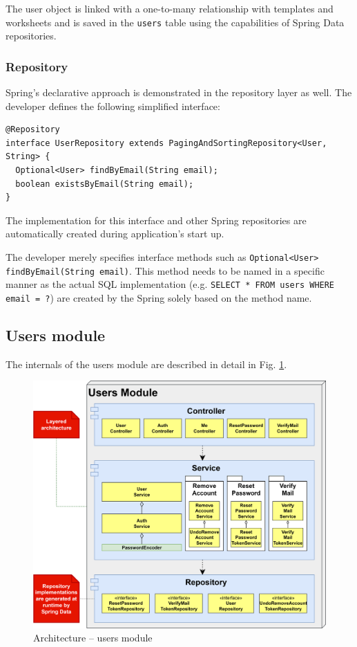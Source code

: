 \documentclass[a4paper,twoside,12pt]{book}
\begin{document}
The user object is linked with a one-to-many relationship with templates and worksheets and is saved in the \verb|users| table using the capabilities of Spring Data repositories.

\subsubsection{Repository}

Spring's declarative approach is demonstrated in the repository layer as well. The developer defines the following simplified interface:
\begin{verbatim}
@Repository
interface UserRepository extends PagingAndSortingRepository<User, String> {
  Optional<User> findByEmail(String email);
  boolean existsByEmail(String email);
}
\end{verbatim}

The implementation for this interface and other Spring repositories are automatically created during application's start up.

The developer merely specifies interface methods such as \texttt{Optional<User> findByEmail(String email)}. 
This method needs to be named in a specific manner \cite{bib:spring_in_action} as the actual SQL implementation (e.g. \texttt{SELECT * FROM users WHERE email = ?}) are created by the Spring
solely based on the method name.


\subsection{Users module}

The internals of the users module are described in detail in Fig. \ref{fig:architecture_users}.


\begin{figure}
  \centering
  \includegraphics[width=\linewidth]{img/architecture_users.png}
  \caption{Architecture – users module}
  \label{fig:architecture_users}
\end{figure}
\end{document}
